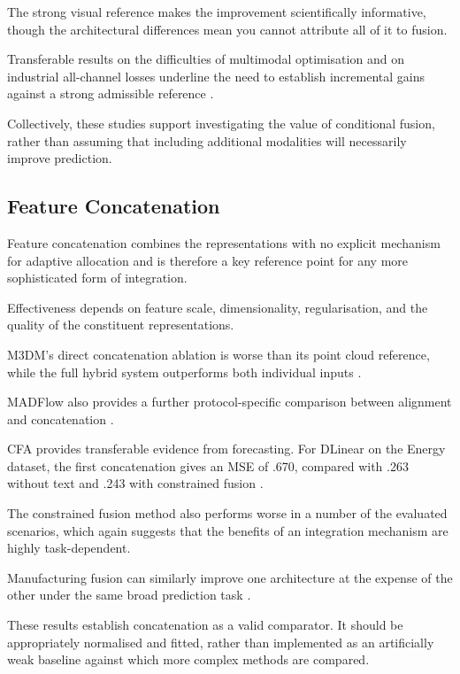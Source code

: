 The strong visual reference makes the improvement scientifically informative, though the
architectural differences mean you cannot attribute all of it to fusion.

Transferable results on the difficulties of multimodal optimisation and on industrial all-channel
losses underline the need to establish incremental gains against a strong admissible reference
\parencite{Wang2020What,Goodarzi2023Deep}.

Collectively, these studies support investigating the value of conditional fusion, rather than
assuming that including additional modalities will necessarily improve prediction.

\subsection{Feature Concatenation}

Feature concatenation combines the representations with no explicit mechanism for adaptive
allocation and is therefore a key reference point for any more sophisticated form of integration.

Effectiveness depends on feature scale, dimensionality, regularisation, and the quality of the
constituent representations.

M3DM's direct concatenation ablation is worse than its point cloud reference, while the full hybrid
system outperforms both individual inputs \parencite[Table~4]{Wang2023Multimodal}.

MADFlow also provides a further protocol-specific comparison between alignment and concatenation
\parencite{Li2025MADFlow}.

CFA provides transferable evidence from forecasting. For DLinear on the Energy dataset, the first
concatenation gives an MSE of .670, compared with .263 without text and .243 with constrained fusion
\parencite[Table~4]{P023}.

The constrained fusion method also performs worse in a number of the evaluated scenarios, which
again suggests that the benefits of an integration mechanism are highly task-dependent.

Manufacturing fusion can similarly improve one architecture at the expense of the other under the
same broad prediction task \parencite[Table~3]{Li2022A}.

These results establish concatenation as a valid comparator. It should be appropriately normalised
and fitted, rather than implemented as an artificially weak baseline against which more complex
methods are compared.

